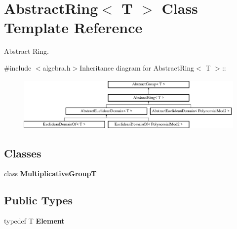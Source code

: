 \hypertarget{class_abstract_ring}{
\section{AbstractRing$<$ T $>$ Class Template Reference}
\label{class_abstract_ring}
}


Abstract Ring.  


{\ttfamily \#include $<$algebra.h$>$}Inheritance diagram for AbstractRing$<$ T $>$::\begin{figure}[H]
\begin{center}
\leavevmode
\includegraphics[height=2.64775cm]{class_abstract_ring}
\end{center}
\end{figure}
\subsection*{Classes}
\begin{DoxyCompactItemize}
\item 
class {\bfseries MultiplicativeGroupT}
\end{DoxyCompactItemize}
\subsection*{Public Types}
\begin{DoxyCompactItemize}
\item 
\hypertarget{class_abstract_ring_acd93e8ce4e2897173310c68fcb60f3e9}{
typedef T {\bfseries Element}}
\label{class_abstract_ring_acd93e8ce4e2897173310c68fcb60f3e9}

\end{DoxyCompactItemize}
